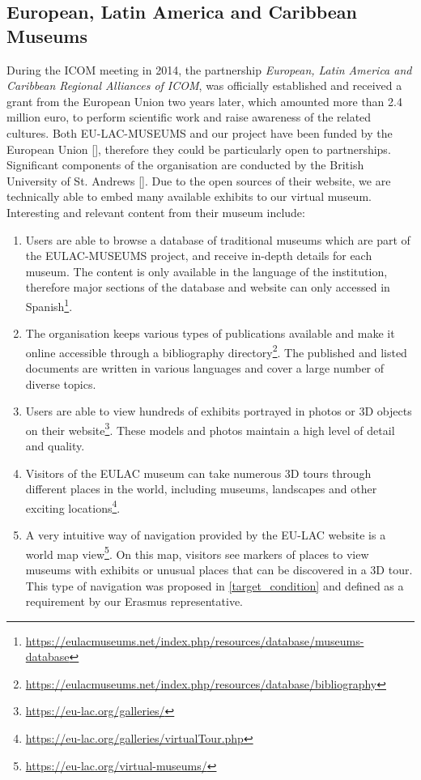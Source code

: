 \subsection{European, Latin America and Caribbean Museums} \label{EULAC}

During the ICOM meeting in 2014, the partnership \emph{European, Latin America and Caribbean Regional Alliances of ICOM}, was officially established and received a grant from the European Union two years later, which amounted more than 2.4 million euro, to perform scientific work and raise awareness of the related cultures. Both EU-LAC-MUSEUMS and our project have been funded by the European Union [\cite{EULAC_grant}], therefore they could be particularly open to partnerships. Significant components of the organisation are conducted by the British University of St. Andrews [\cite{EULAC_launched}]. Due to the open sources of their website, we are technically able to embed many available exhibits to our virtual museum. Interesting and relevant content from their museum include:

\begin{enumerate} 
\item Users are able to browse a database of traditional museums which are part of the EULAC-MUSEUMS project, and receive in-depth details for each museum. The content is only available in the language of the institution, therefore major sections of the database and website can only accessed in Spanish\footnote{\url{https://eulacmuseums.net/index.php/resources/database/museums-database}}.
\item The organisation keeps various types of publications available and make it online accessible through a bibliography directory\footnote{\url{https://eulacmuseums.net/index.php/resources/database/bibliography}}. The published and listed documents are written in various languages and cover a large number of diverse topics.
    \item Users are able to view hundreds of exhibits portrayed in photos or 3D objects on their website\footnote{\url{https://eu-lac.org/galleries/}}. These models and photos maintain a high level of detail and quality.
    \item Visitors of the EULAC museum can take numerous 3D tours through different places in the world, including museums, landscapes and other exciting locations\footnote{\url{https://eu-lac.org/galleries/virtualTour.php}}.
    \item A very intuitive way of navigation provided by the EU-LAC website is a world map view\footnote{\url{https://eu-lac.org/virtual-museums/}}. On this map, visitors see markers of places to view museums with exhibits or unusual places that can be discovered in a 3D tour. This type of navigation was proposed in \ref{target_condition} and defined as a requirement by our Erasmus representative.
\end{enumerate}

